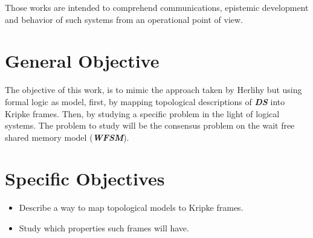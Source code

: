 \documentclass[oneside,openany]{tufte-book} %
\newcommand{\ds}{\textbf{\textit{DS}}\xspace}
\newcommand{\sh}{\textbf{\textit{WFSM}}\xspace}
\begin{document}
Those works are intended to comprehend communications, epistemic development and 
behavior of such systems from an operational point of view.

\chapter{General Objective}

The objective of this work, is to mimic the approach taken by Herlihy but using formal logic as model, first, by mapping topological descriptions of {\ds} into Kripke frames. Then, by studying a specific problem in the light of logical systems. The problem to study will be the consensus problem on the wait free shared memory model (\sh).

\chapter{Specific Objectives}


\begin{itemize}[topsep=0pt,itemsep=-1ex,partopsep=1ex,parsep=1ex]
\item Describe a way to map topological models to Kripke frames.
\item Study which properties such frames will have.
\end{itemize}

%




\end{document}
